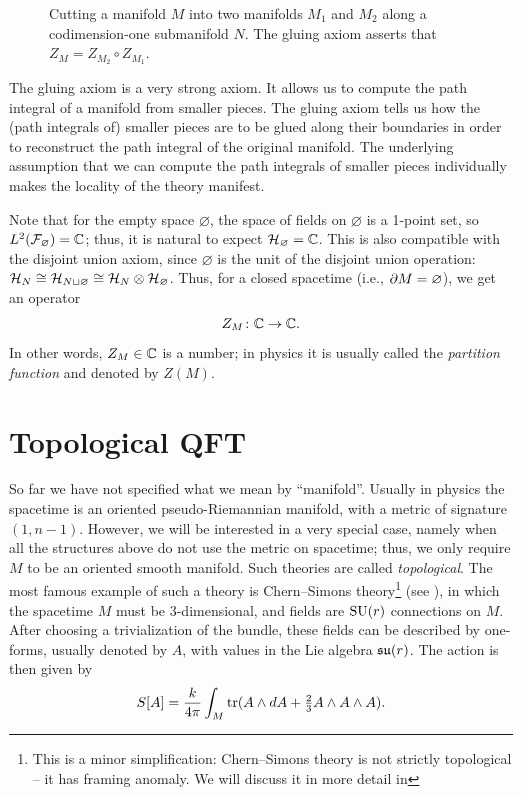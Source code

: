 \begin{enumerate}
\begin{figure}[ht]
\begin{tikzpicture}[scale=0.25]
    	\end{tikzpicture}

    	\caption{Cutting a manifold $M$ into two manifolds $M_1$ and $M_2$ along
      a codimension-one submanifold $N$. The gluing axiom asserts that
      $Z_M=Z_{M_2} \circ Z_{M_1}$.}
    	\label{f:gluing}
    \end{figure}

    The gluing axiom is a very strong axiom. It allows us to compute the path
    integral of a manifold from smaller pieces. The gluing axiom tells us how
    the (path integrals of) smaller pieces are to be glued along their
    boundaries in order to reconstruct the path integral of the original
    manifold. The underlying assumption that we can compute the path integrals
    of smaller pieces individually makes the locality of the theory manifest.
\end{enumerate}


Note that for the empty space $\varnothing$, the space of fields on
$\varnothing$ is a 1-point set, so $L^2(\mathcal{F}_\varnothing)=\mathbb{C}$; thus, it is
natural to expect $\mathcal{H}_\varnothing=\mathbb{C}$. This is also compatible with the
disjoint union axiom, since $\varnothing$ is the unit of the disjoint union
operation: $\mathcal{H}_{N} \cong \mathcal{H}_{N \sqcup \varnothing} \cong \mathcal{H}_{N}\otimes
\mathcal{H}_{\varnothing}$. Thus, for a closed spacetime (i.e., $\partial M=\varnothing$),
we get an operator
\begin{equation}
	Z_M\colon \mathbb{C}\to \mathbb{C}.
\end{equation}
In other words, $Z_M\in \mathbb{C}$ is a number; in physics it is usually called the
\emph{partition function} and denoted by $Z(M)$.

\section{Topological QFT}\label{s:tqft}

So far we have not specified what we mean by ``manifold''. Usually in physics
the spacetime is an oriented pseudo-Riemannian manifold, with a metric of
signature $(1, n-1)$. However, we will be interested in a very special case,
namely when all the structures above do not use the metric on spacetime; thus,
we only require $M$ to be an oriented smooth manifold. Such theories are called
\emph{topological}. The most famous example of such a theory is Chern--Simons
theory\footnote{This is a minor simplification: Chern--Simons theory is not 
  strictly topological -- it has framing anomaly. We will discuss it in 
  more detail in } (see ), in which the 
spacetime $M$ must be
3-dimensional, and fields are $\mathrm{SU}(r)$ connections on $M$. After choosing a
trivialization of the bundle, these fields can be described by one-forms,
usually denoted by $A$, with values in the Lie algebra $\mathfrak{su}(r)$. The action is
then given by
\begin{equation}
  S[A] = \frac{k}{4 \pi} \int_M \operatorname{tr}(A\wedge dA + \tfrac{2}{3}A\wedge A\wedge A).
\end{equation}

